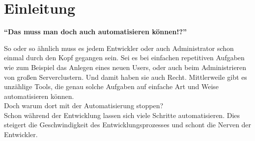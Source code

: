 \chapter{Einleitung}
\begin{center}\textbf{\enquote{Das muss man doch auch automatisieren können!?}}\end{center}
So oder so ähnlich muss es jedem Entwickler oder auch Administrator schon einmal durch den Kopf gegangen sein. Sei es bei einfachen repetitiven Aufgaben wie zum Beispiel das Anlegen eines neuen Users, oder auch beim Administrieren von großen Serverclustern. Und damit haben sie auch Recht. Mittlerweile gibt es unzählige Tools, die genau solche Aufgaben auf einfache Art und Weise automatisieren können.\\
Doch warum dort mit der Automatisierung stoppen?\\
Schon während der Entwicklung lassen sich viele Schritte automatisieren. Dies steigert die Geschwindigkeit des Entwicklungsprozesses und schont die Nerven der Entwickler.
